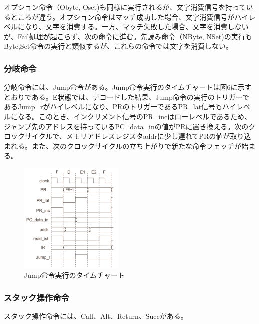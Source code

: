 \documentclass[submit,techrep]{ipsj}
\begin{document}
オプション命令（Obyte, Oset)も同様に実行されるが、文字消費信号を持っているところが違う。オプション命令はマッチ成功した場合、文字消費信号がハイレベルになり、文字を消費する。一方、マッチ失敗した場合、文字を消費しないが、Fail処理が起こらず、次の命令に進む。先読み命令（NByte, NSet)の実行もByte,Set命令の実行と類似するが、これらの命令では文字を消費しない。\\

\subsubsection{分岐命令}

分岐命令には、Jump命令がある。Jump命令実行のタイムチャートは図6に示すとおりである。E状態では、デコードした結果、Jump命令の実行のトリガーであるJump\_rがハイレベルになり、PRのトリガーであるPR\_lat信号もハイレベルになる。このとき、インクリメント信号のPR\_incはローレベルであるため、ジャンプ先のアドレスを持っているPC\_data\_inの値がPRに置き換える。次のクロックサイクルで、メモリアドレスレジスタaddrに少し遅れてPRの値が取り込まれる。また、次のクロックサイクルの立ち上がりで新たな命令フェッチが始まる。


\begin{figure}[h]
    \begin{center}
        \includegraphics[width=50mm]{./fig/Jump}
       \caption{Jump命令実行のタイムチャート}
    \end{center}
\end{figure}

\subsubsection{スタック操作命令}
スタック操作命令には、Call、Alt、Return、Succがある。
\end{document}
